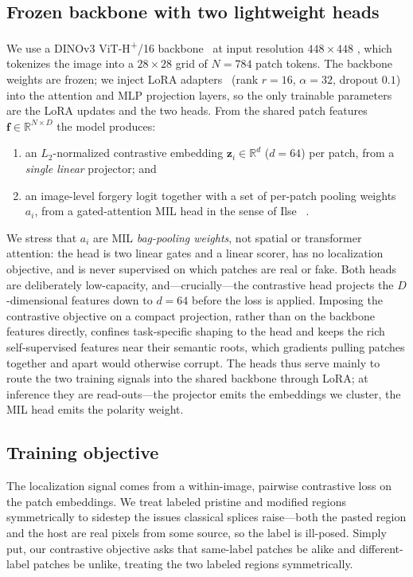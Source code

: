 \subsection{Frozen backbone with two lightweight heads}
\label{sec:backbone}
We use a DINOv3 ViT-H\textsuperscript{+}/16 backbone~\cite{dinov3} at input
resolution $448\times448$
, which tokenizes the image into a $28\times28$ grid of $N{=}784$ patch tokens.
The backbone weights are frozen; we inject LoRA adapters~\cite{lora}
(rank $r{=}16$, $\alpha{=}32$, dropout $0.1$) into the attention and MLP
projection layers, so the only trainable parameters are the LoRA updates and the
two heads. From the shared patch features $\mathbf{f}\in\mathbb{R}^{N\times D}$
the model produces:
\begin{enumerate}\itemsep2pt
  \item an $L_2$-normalized contrastive embedding
        $\mathbf{z}_i\in\mathbb{R}^{d}$ ($d{=}64$) per patch, from a
        \emph{single linear} projector; and
  \item an image-level forgery logit together with a set of per-patch pooling
        weights $a_i$, from a gated-attention MIL head in the sense of Ilse
        \etal~\cite{ilse2018mil}.
\end{enumerate}
We stress that $a_i$ are MIL \emph{bag-pooling weights}, not spatial or
transformer attention: the head is two linear gates and a linear scorer, has no
localization objective, and is never supervised on which patches are real or
fake. Both heads are deliberately low-capacity, and---crucially---the
contrastive head projects the $D$-dimensional features down to $d{=}64$ before
the loss is applied. Imposing the contrastive objective on a compact projection,
rather than on the backbone features directly, confines task-specific shaping to
the head and keeps the rich self-supervised features near their semantic roots,
which gradients pulling patches together and apart would otherwise corrupt. The
heads thus serve mainly to route the two training signals into the shared
backbone through LoRA; at inference they are read-outs---the projector emits the
embeddings we cluster, the MIL head emits the polarity weight.

\subsection{Training objective}
\label{sec:objective}
The localization signal comes from a within-image, pairwise contrastive loss on
the patch embeddings. We treat labeled pristine and modified regions
symmetrically to sidestep the issues classical splices raise---both the pasted
region and the host are real pixels from some source, so the label is ill-posed.
Simply put, our contrastive objective asks that same-label patches be alike and
different-label patches be unlike, treating the two labeled regions symmetrically.


